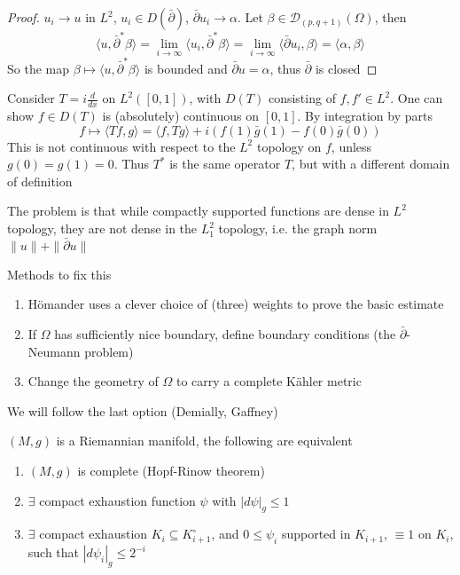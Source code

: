 \documentclass[../main.tex]{subfiles}
\begin{document}
\begin{proof}
$u_i\to u$ in $L^2$, $u_i\in D(\bar\partial)$, $\bar\partial u_i\to\alpha$. Let $\beta\in\mathcal D_{(p,q+1)}(\Omega)$, then
 \[\langle u,\bar\partial^*\beta\rangle=\lim_{i\to\infty}\langle u_i,\bar\partial^*\beta\rangle=\lim_{i\to \infty}\langle \bar\partial u_i,\beta\rangle=\langle \alpha,\beta\rangle\]
So the map $\beta\mapsto \langle u,\bar\partial^*\beta\rangle$ is bounded and $\bar\partial u=\alpha$, thus $\bar\partial$ is closed
\end{proof}
 
\begin{example}
Consider $T=i\frac{d}{dx}$ on $L^2([0,1])$, with $D(T)$ consisting of $f,f'\in L^2$. One can show $f\in D(T)$ is (absolutely) continuous on $[0,1]$. By  integration by parts
 \[f\mapsto\langle Tf,g\rangle=\langle f,Tg\rangle+i(f(1)\bar g(1)-f(0)\bar g(0))\]
 This is not continuous with respect to the $L^2$ topology on $f$, unless $g(0)=g(1)=0$. Thus $T^*$ is the same operator $T$, but with a different domain of definition
\end{example}
 
The problem is that while compactly supported functions are dense in $L^2$ topology, they are not dense in the $L^2_1$ topology, i.e. the graph norm $\|u\|+\|\bar\partial u\|$
 
 
Methods to fix this
\begin{enumerate}
\item H\"omander uses a clever choice of (three) weights to prove the basic estimate
\item If $\Omega$ has sufficiently nice boundary, define boundary conditions (the $\bar\partial$-Neumann problem)
\item Change the geometry of $\Omega$ to carry a complete K\"ahler metric
\end{enumerate}
We will follow the last option (Demially, Gaffney)

\begin{lemma}\label{Equivalent conditions of completeness and compact exhaustion}
$(M,g)$ is a Riemannian manifold, the following are equivalent
\begin{enumerate}
\item $(M,g)$ is complete (Hopf-Rinow theorem)
\item $\exists$ compact exhaustion function $\psi$ with $|d\psi|_g\leq1$
\item $\exists$ compact exhaustion $K_i\subseteq K_{i+1}^\circ$, and $0\leq \psi_i$ supported in $K_{i+1}$, $\equiv1$ on $K_i$, such that $|d\psi_i|_g\leq 2^{-i}$
\end{enumerate}
\end{lemma}
\end{document}
